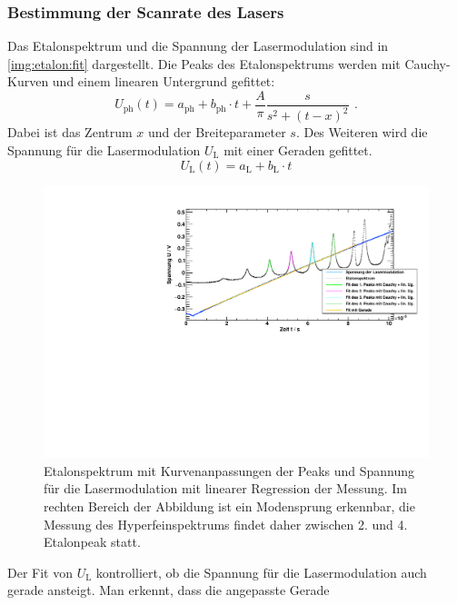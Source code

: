 \subsubsection*{Bestimmung der Scanrate des Lasers}
\label{sub:scanrate}
Das Etalonspektrum und die Spannung der Lasermodulation sind in \autoref{img:etalon:fit} dargestellt.
Die Peaks des Etalonspektrums werden mit Cauchy-Kurven und einem linearen Untergrund gefittet:
\begin{equation}
    U_\text{ph}(t) = a_\text{ph} + b_\text{ph} \cdot t + \frac{A}{\pi} \frac{s}{s^2 + (t-x)^2} \ \, .
\end{equation}
Dabei ist das Zentrum $x$ und der Breiteparameter $s$.
Des Weiteren wird die Spannung für die Lasermodulation $U_\text{L}$ mit einer Geraden gefittet.
\begin{equation}
    U_\text{L}(t) = a_\text{L} + b_\text{L} \cdot t
\end{equation}
\begin{figure}[H]
\begin{center}
    \includegraphics[width=\textwidth]{../img/part2/up-etalon_zoom_fit.pdf}
    \caption{Etalonspektrum mit Kurvenanpassungen der Peaks und
    Spannung für die Lasermodulation mit linearer Regression der Messung.
    Im rechten Bereich der Abbildung ist ein Modensprung erkennbar,
    die Messung des Hyperfeinspektrums findet daher zwischen 2. und 4. Etalonpeak statt.}
    \label{img:etalon:fit}
\end{center}
\end{figure}
Der Fit von $U_\text{L}$ kontrolliert, ob die Spannung für die Lasermodulation auch gerade ansteigt. Man erkennt, dass die angepasste Gerade 
